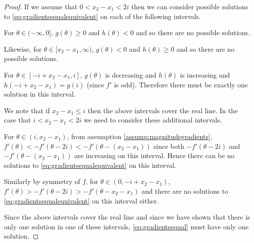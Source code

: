 \begin{proof}
			If we assume that $0< x_2 - x_1 < 2i$ then we can consider possible solutions to \eqref{eq:gradientsequalequivalent} on each of the following intervals. 
			
			For $\theta \in (-\infty, 0]$, $g(\theta)\geq 0$ and $h(\theta) < 0$ and so there are no possible solutions.
			
			Likewise, for $\theta \in [x_2 - x_1,\infty)$, $g(\theta)<0$ and $h(\theta) \geq 0$ and so there are no possible solutions.
			
			For $\theta \in [-i + x_2 - x_1,i]$, $g(\theta)$ is decreasing and $h(\theta)$ is increasing and $h(-i+x_2 -x_1) = g(i)$ (since $f'$ is odd). Therefore there must be exactly one solution in this interval.
			
			We note that if $x_2 - x_1 \leq i$ then the above intervals cover the real line. In the case that $i <x_2 - x_1 < 2i$ we need to consider these additional intervals.

			For $\theta \in (i,x_2 - x_1)$, from assumption \ref{assump:magnitudegradients}, $f'(\theta) < -f'(\theta - 2i) < -f'(\theta - (x_2 - x_1))$ since both $-f'(\theta - 2i)$ and $-f'(\theta - (x_2 - x_1))$ are increasing on this interval. Hence there can be no solutions to \eqref{eq:gradientsequalequivalent} on this interval.
			
			Similarly by symmetry of $f$, for $\theta \in (0,-i+x_2-x_1)$,  $f'(\theta)>-f'(\theta - 2i) > -f'(\theta - x_2 - x_1)$ and there are no solutions to \eqref{eq:gradientsequalequivalent} on this interval either.
			
			Since the above intervals cover the real line and since we have shown that there is only one solution in one of these intervals, \eqref{eq:gradientsequal} must have only one solution.
		\end{proof}
		
